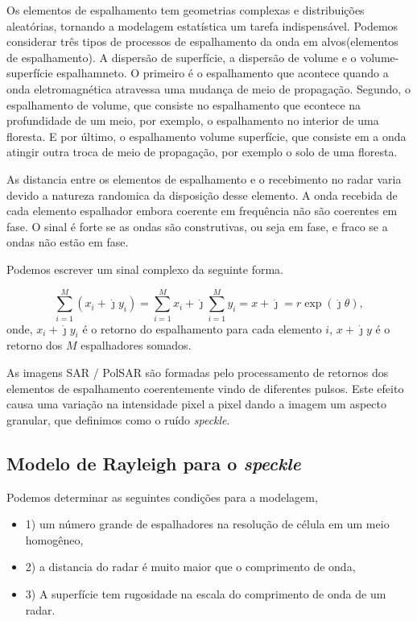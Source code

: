  Os elementos de espalhamento tem geometrias complexas e distribuições aleatórias, tornando a modelagem estatística um tarefa indispensável. Podemos considerar três tipos de processos de espalhamento da onda em alvos(elementos de espalhamento). A dispersão de superfície, a dispersão de volume e o volume-superfície espalhamneto. O primeiro é o espalhamento que acontece quando a onda eletromagnética atravessa uma mudança de meio de propagação. Segundo, o espalhamento de volume, que consiste no espalhamento que econtece na profundidade de um meio, por exemplo, o espalhamento no interior de uma floresta. E por último, o espalhamento volume superfície, que consiste em a onda atingir outra troca de meio de propagação, por exemplo o solo de uma floresta.
 
 As distancia entre os elementos de espalhamento e o recebimento no radar varia devido a natureza randomica da disposição desse elemento. A onda recebida de cada elemento espalhador embora coerente em frequência não são coerentes em fase. O sinal é forte se as ondas são construtivas, ou seja em fase, e fraco se a ondas não estão em fase.
 
 Podemos escrever um sinal complexo da seguinte forma.

\begin{equation}\label{eq:speckle_soma}
\sum_{i=1}^{M}(x_i+\dot{\jmath} y_i)=\sum_{i=1}^{M}x_i+\dot{\jmath}\sum_{i=1}^{M} y_i=x+\dot{\jmath}=r\exp(\dot{\jmath}\theta),
\end{equation}
onde, $x_i+\dot{\jmath} y_i$ é o retorno do espalhamento para cada elemento $i$, $x+\dot{\jmath}y$ é o retorno dos $M$ espalhadores somados.

As imagens SAR / PolSAR são formadas pelo processamento de retornos dos elementos de espalhamento coerentemente vindo de diferentes pulsos. Este efeito causa uma variação na intensidade pixel a pixel dando a imagem um aspecto granular, que definimos como o ruído \textit{speckle}.  

\subsection{Modelo de Rayleigh para o \textit{speckle}}
Podemos determinar as seguintes condições para a modelagem,
\begin{itemize}
\item 1) um número grande de espalhadores na resolução de célula em um meio homogêneo,
\item 2) a distancia do radar é muito maior que o comprimento de onda,
\item 3) A superfície tem rugosidade na escala do comprimento de onda de um radar.
\end{itemize}

